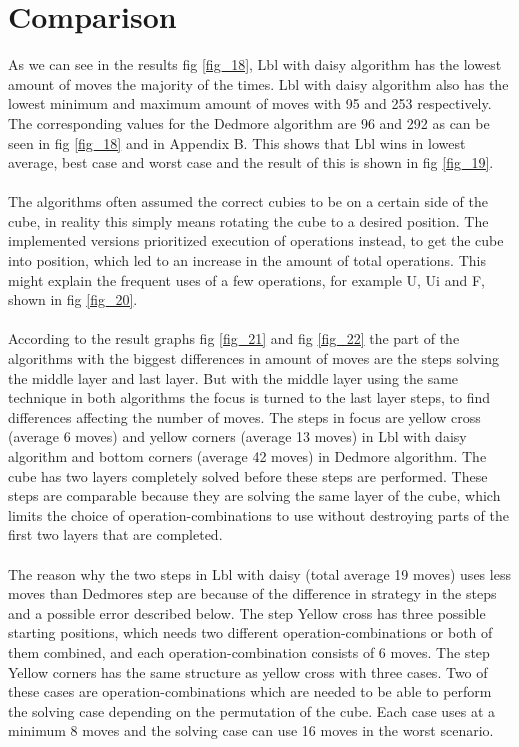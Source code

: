 \documentclass[a4paper,11pt]{kth-mag}
\begin{document}
\section{Comparison}
As we can see in the results fig \ref{fig_18}, Lbl with daisy algorithm has the lowest amount of moves the majority of the times. Lbl with daisy algorithm also has the lowest minimum and maximum amount of moves with 95 and 253 respectively. The corresponding values for the Dedmore algorithm are 96 and 292 as can be seen in fig \ref{fig_18} and in Appendix B. This shows that Lbl wins in lowest average, best case and worst case and the result of this is shown in fig \ref{fig_19}.\\\\
The algorithms often assumed the correct cubies to be on a certain side of the cube, in reality this simply means rotating the cube to a desired position. The implemented versions prioritized execution of operations instead, to get the cube into position, which led to an increase in the amount of total operations. This might explain the frequent uses of a few operations, for example U, Ui and F, shown in fig \ref{fig_20}.\\\\
According to the result graphs fig \ref{fig_21} and fig \ref{fig_22} the part of the algorithms with the biggest differences in amount of moves are the steps solving the middle layer and last layer. But with the middle layer using the same technique in both algorithms the focus is turned to the last layer steps, to find differences affecting the number of moves. The steps in focus are yellow cross (average 6 moves) and yellow corners (average 13 moves) in Lbl with daisy algorithm and bottom corners (average 42 moves) in Dedmore algorithm. The cube has two layers completely solved before these steps are performed. These steps are comparable because they are solving the same layer of the cube, which limits the choice of operation-combinations to use without destroying parts of the first two layers that are completed.\\\\ 
The reason why the two steps in Lbl with daisy (total average 19 moves) uses less moves than Dedmores step are because of the difference in strategy in the steps and a possible error described below.
The step Yellow cross has three possible starting positions, which needs two different operation-combinations or both of them combined, and each operation-combination consists of 6 moves.
The step Yellow corners has the same structure as yellow cross with three cases. Two of these cases are operation-combinations which are needed to be able to perform the solving case depending on the permutation of the cube. Each case uses at a minimum 8 moves and the solving case can use 16 moves in the worst scenario.\\\\
\end{document}
